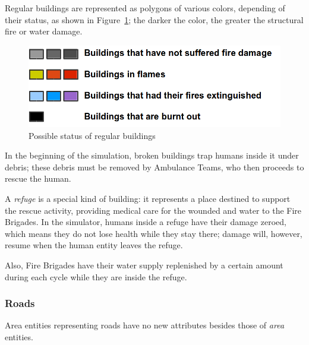 \documentclass{article}
\begin{document}
Regular buildings are represented as polygons of various colors, depending of their status, as shown in Figure~\ref{fig:building_status}; the darker the color, the greater the structural fire or water damage.
\begin{figure}[ht]
  \centering
  \includegraphics[width=1.0\textwidth]{figs/building_status}
  \caption{Possible status of regular buildings}
  \label{fig:building_status}
\end{figure}

In the beginning of the simulation, broken buildings trap humans inside it under debris; these debris must be removed by Ambulance Teams, who then proceeds to rescue the human.

A \emph{refuge} is a special kind of building: it represents a place destined to support the rescue activity, providing medical care for the wounded and water to the Fire Brigades. In the simulator, humans inside a refuge have their damage zeroed, which means they do not lose health while they stay there; damage will, however, resume when the human entity leaves the refuge.

Also, Fire Brigades have their water supply replenished by a certain amount during each cycle while they are inside the refuge.
\subsubsection{Roads}
Area entities representing roads have no new attributes besides those of \emph{area} entities.
\end{document}
